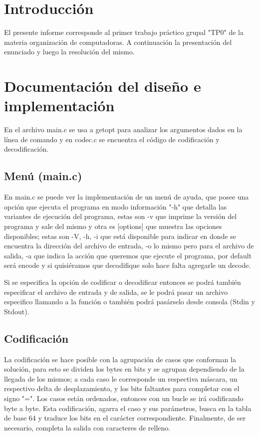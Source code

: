 \documentclass[a4paper,11pt, margin=1in]{article}
\begin{document}
\newpage{}
\tableofcontents
\newpage{}

\section{Introducción}

El presente informe corresponde al primer trabajo práctico grupal "TP0" de la materia organización de computadoras.
A continuación la presentación del enunciado y luego la resolución del mismo.


\section{Documentación del diseño e implementación}
En el archivo main.c se usa a getopt para analizar los argumentos dados en la línea de comando y en codec.c se encuentra el código de codificación y decodificación.

\subsection{Menú (main.c)}
En  main.c se puede ver la implementación de un menú de ayuda, que posee una opción que ejecuta el programa en modo información "-h" que detalla las variantes de ejecución del programa, estas son -v que imprime la versión del programa y sale del mismo y otra es [options] que muestra las opciones disponibles; estas son -V, -h, -i que está disponible para indicar en donde se encuentra la dirección del archivo de entrada, -o lo mismo pero para el archivo de salida, -a que indica la acción que queremos que ejecute el programa, por default será encode y si quisiéramos que decodifique solo hace falta agregarle un decode.

Si se especifica la opción de codificar o decodificar entonces se podrá también especificar el archivo de entrada y de salida, se le podrá pasar un archivo especifico llamando a la función o también podrá pasárselo desde consola (Stdin y Stdout).

\subsection{Codificación}
La codificación se hace posible con la agrupación de casos que conforman la solución, para esto se dividen los bytes en bits y se agrupan dependiendo de la llegada de los mismos; a cada caso le corresponde un respectiva máscara, un respectivo delta de desplazamiento, y los bits faltantes para completar con el signo "=". Los casos están ordenados, entonces con un bucle se irá codificando byte a byte. Esta codificación, agarra el caso y sus parámetros, busca en la tabla de base 64 y traduce los bits en el carácter correspondiente. Finalmente, de ser necesario, completa la salida con caracteres de relleno.
\end{document}
